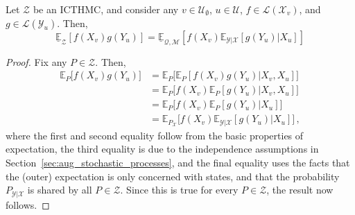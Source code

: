 \documentclass[twoside,11pt]{article}
\newcommand{\states}{\mathcal{X}}
\newcommand{\observs}{\mathcal{Y}}
\newcommand{\lexp}{\underline{\mathbb{E}}_{\rateset,\mathcal{M}}}
\newcommand{\gambles}{\mathcal{L}}
\newcommand{\rateset}{\mathcal{Q}}
\begin{document}
\begin{proposition}\label{prop:decomp}
Let $\mathcal{Z}$ be an ICTHMC, and consider any $v\in\mathcal{U}_\emptyset$, $u\in\mathcal{U}$, $f\in\gambles(\states_v)$, and $g\in\gambles(\observs_u)$. Then,
\begin{equation*}
\underline{\mathbb{E}}_\mathcal{Z}\left[ f(X_v)g(Y_u) \right] = \lexp\left[ f(X_v)\mathbb{E}_{\observs\vert\states}[g(Y_u)\vert X_u] \right] 
\end{equation*}
\end{proposition}
\begin{proof}
Fix any $P\in\mathcal{Z}$. Then,
\begin{align*}
\mathbb{E}_P\bigl[ f(X_v)g(Y_u) \bigr] &= \mathbb{E}_P\bigl[ \mathbb{E}_P\left[ f(X_v)g(Y_u) \vert X_v,X_u \right] \bigr] \\
&= \mathbb{E}_P\bigl[ f(X_v)\mathbb{E}_P[ g(Y_u) \vert X_v,X_u ] \bigr] \\
&= \mathbb{E}_P\bigl[ f(X_v)\mathbb{E}_P[ g(Y_u) \vert X_u ] \bigr] \\
&= \mathbb{E}_{P_\states}\bigl[ f(X_v)\mathbb{E}_{\observs\vert\states}[ g(Y_u) \vert X_u ] \bigr] \,,
\end{align*}
where the first and second equality follow from the basic properties of expectation, the third equality is due to the independence assumptions in Section~\ref{sec:aug_stochastic_processes}, and the final equality uses the facts that the (outer) expectation is only concerned with states, and that the probability $P_{\observs\vert\states}$ is shared by all $P\in\mathcal{Z}$. Since this is true for every $P\in\mathcal{Z}$, the result now follows.
\end{proof}
\end{document}
